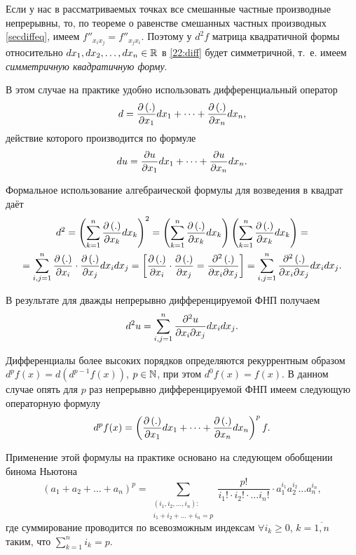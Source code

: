 \documentclass[../../main.tex]{subfiles}
\begin{document}
	Если у нас в рассматриваемых точках все смешанные частные производные 
	непрерывны, то, по теореме о равенстве смешанных частных производных 
	\eqref{secdiffeq}, имеем $f''_{x_ix_j} = f''_{x_jx_i}$. Поэтому у $d^2f$ 
	матрица квадратичной формы относительно $dx_1, dx_2,\dots, dx_n\in\mathbb{R}$ в 
	\eqref{22:diff} будет симметричной, т.~е. имеем 
	\emph{симметричную квадратичную форму}.
	
	В этом случае на практике удобно использовать дифференциальный оператор
	\begin{equation}
		d = \frac{\partial \left(.\right)}{\partial x_1}dx_1 + \dots + 
		\frac{\partial \left(.\right)}{\partial x_n}dx_n,
		\label{23:diff}
	\end{equation}
	действие которого производится по формуле
	\[du = \frac{\partial u}{\partial x_1}dx_1 + \dots + \frac{\partial u}{\partial x_n}dx_n.\]
	
	Формальное использование алгебраической формулы для возведения в квадрат 
	даёт
	\begin{gather*}
		d^2 = \left(\sum_{k = 1}^n\frac{\partial \left(.\right)}{\partial x_k}dx_k\right)^2 = 
		\left(\sum_{k = 1}^n\frac{\partial \left(.\right)}{\partial x_k}dx_k\right)
		\left(\sum_{k = 1}^n\frac{\partial \left(.\right)}{\partial x_k}dx_k\right) = \\
		= \sum_{i, j = 1}^n\frac{\partial \left(.\right)}{\partial x_i}\cdot
		\frac{\partial \left(.\right)}{\partial x_j}dx_idx_j = \left[\begin{aligned}
			\frac{\partial \left(.\right)}{\partial x_i}\cdot\frac{\partial \left(.\right)}{\partial x_j} = 
			\frac{\partial ^2\left(.\right)}{\partial x_i\partial x_j}
		\end{aligned}\right] = 
		\sum_{i, j = 1}^n\frac{\partial ^2\left(.\right)}{\partial x_i\partial x_j}dx_idx_j.
	\end{gather*}
	
	В результате для дважды непрерывно дифференцируемой ФНП получаем
	\[d^2u = \sum_{i, j = 1}^n\frac{\partial ^2u}{\partial x_i\partial x_j}dx_idx_j.\]
	
	Дифференциалы более высоких порядков определяются рекуррентным образом 
	$d^pf(x) = d\left(d^{p - 1}f(x)\right)$, $p\in\mathbb{N}$, при этом 
	$d^0f(x) = f(x)$. В данном случае опять для $p$ раз непрерывно 
	дифференцируемой ФНП имеем следующую операторную формулу
	\begin{equation}
		d^pf(x) = \left(\frac{\partial \left(.\right)}{\partial x_1}dx_1 + \dots + 
		\frac{\partial \left(.\right)}{\partial x_n}dx_n\right)^p f.
		\label{24:diff}
	\end{equation}
	
	Применение этой формулы на практике основано на следующем обобщении бинома 
	Ньютона
	\[\left(a_1 + a_2 + \dots + a_n\right)^p = \sum_{
		\substack{
			\left(i_1, i_2, \dots, i_n\right):\\
			i_1 + i_2 + \dots + i_n = p
	}}\frac{p!}{i_1!\cdot i_2!\cdot \dots i_n!}\cdot a_1^{i_1}a_2^{i_2}
	\dots a_n^{i_n},\]
	где суммирование проводится по всевозможным индексам $\forall i_k\ge 0$, 
	$k = \overline{1, n}$ таким, что $\sum\limits_{k = 1}^ni_k = p$.
\end{document}

